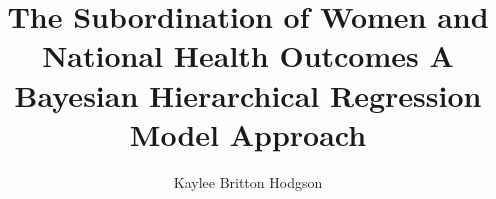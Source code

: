 \documentclass[]{statthesisMEMOIR}
\title{The Subordination of Women and National Health Outcomes \titlebreak A Bayesian Hierarchical Regression Model Approach}
\author{Kaylee Britton Hodgson}
\begin{document}



\nocite{*}		       
	
\end{document}
